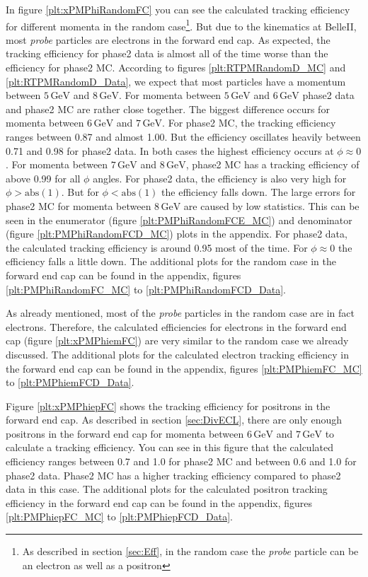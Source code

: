 \documentclass[a4paper,11pt,twosided,final,german,openbib,pdftex,listof=totoc,bibliography=totoc]{scrbook}
\begin{document}
In figure \ref{plt:xPMPhiRandomFC} you can see the calculated tracking efficiency for different momenta in the random case\footnote{As described in section \ref{sec:Eff}, in the random case the \textit{probe} particle can be an electron as well as a positron}. But due to the kinematics at BelleII, most \textit{probe} particles are electrons in the forward end cap. As expected, the tracking efficiency for phase2 data is almost all of the time worse than the efficiency for phase2 MC. According to figures \ref{plt:RTPMRandomD_MC} and \ref{plt:RTPMRandomD_Data}, we expect that most particles have a momentum between $5\,\textrm{GeV}$ and $8\,\textrm{GeV}$. For momenta between $5\,\textrm{GeV}$ and $6\,\textrm{GeV}$ phase2 data and phase2 MC are rather close together. The biggest difference occurs for momenta between $6\,\textrm{GeV}$ and $7\,\textrm{GeV}$. For phase2 MC, the tracking efficiency ranges between 0.87 and almost 1.00. But the efficiency oscillates heavily between 0.71 and 0.98 for phase2 data. In both cases the highest efficiency occurs at $\phi \approx 0$. For momenta between $7\,\textrm{GeV}$ and $8\,\textrm{GeV}$, phase2 MC has a tracking efficiency of above 0.99 for all $\phi$ angles. For phase2 data, the efficiency is also very high for $\phi >\textrm{abs}(1)$. But for $\phi < \textrm{abs}(1)$ the efficiency falls down. The large errors for phase2 MC for momenta between $8\,\textrm{GeV}$ are caused by low statistics. This can be seen in the enumerator (figure \ref{plt:PMPhiRandomFCE_MC}) and denominator (figure \ref{plt:PMPhiRandomFCD_MC}) plots in the appendix. For phase2 data, the calculated tracking efficiency is around 0.95 most of the time. For $\phi \approx 0$ the efficiency falls a little down. The additional plots for the random  case in the forward end cap can be found in the appendix, figures \ref{plt:PMPhiRandomFC_MC} to \ref{plt:PMPhiRandomFCD_Data}.


As already mentioned, most of the \textit{probe} particles in the random case are in fact electrons. Therefore, the calculated efficiencies for electrons in the forward end cap (figure \ref{plt:xPMPhiemFC}) are very similar to the random case we already discussed. The additional plots for the calculated electron tracking efficiency in the forward end cap can be found in the appendix, figures \ref{plt:PMPhiemFC_MC} to \ref{plt:PMPhiemFCD_Data}.



Figure \ref{plt:xPMPhiepFC} shows the tracking efficiency for positrons in the forward end cap. As described in section \ref{sec:DivECL}, there are only enough positrons in the forward end cap for momenta between $6\,\textrm{GeV}$ and $7\,\textrm{GeV}$ to calculate a tracking efficiency. You can see in this figure that the calculated efficiency ranges between 0.7 and 1.0 for phase2 MC and between 0.6 and 1.0 for phase2 data. Phase2 MC has a higher tracking efficiency compared to phase2 data in this case.
 The additional plots for the calculated positron tracking efficiency in the forward end cap can be found in the appendix, figures \ref{plt:PMPhiepFC_MC} to \ref{plt:PMPhiepFCD_Data}.
\end{document}
